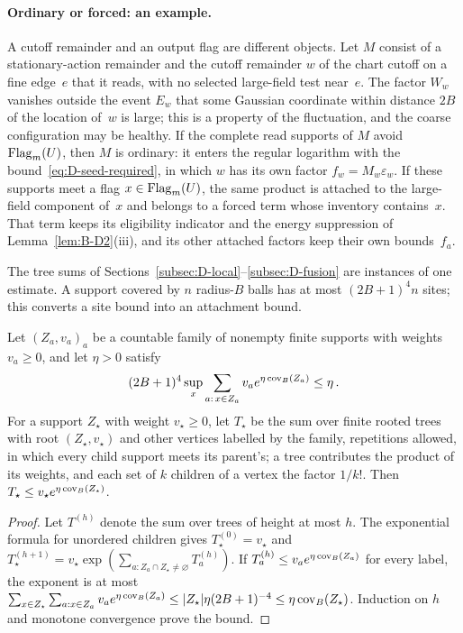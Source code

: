 \paragraph{Ordinary or forced: an example.} A cutoff remainder and an output flag are different objects. Let $M$ consist of a stationary-action remainder and the cutoff remainder $w$ of the chart cutoff on a fine edge~$e$ that it reads, with no selected large-field test near~$e$. The factor $W_w$ vanishes outside the event $E_w$ that some Gaussian coordinate within distance $2B$ of the location of~$w$ is large; this is a property of the fluctuation, and the coarse configuration may be healthy. If the complete read supports of $M$ avoid $\operatorname{Flag}_m(U)$, then $M$ is ordinary: it enters the regular logarithm with the bound~\eqref{eq:D-seed-required}, in which $w$ has its own factor $f_w=M_w\varepsilon_w$. If these supports meet a flag $x\in\operatorname{Flag}_m(U)$, the same product is attached to the large-field component of~$x$ and belongs to a forced term whose inventory contains~$x$. That term keeps its eligibility indicator and the energy suppression of Lemma~\ref{lem:B-D2}(iii), and its other attached factors keep their own bounds~$f_a$.

The tree sums of Sections~\ref{subsec:D-local}--\ref{subsec:D-fusion} are instances of one estimate. A support covered by $n$ radius-$B$ balls has at most $(2B+1)^4n$ sites; this converts a site bound into an attachment bound.

\begin{lemma}\label{lem:D-rooted}
Let $(Z_a,v_a)_a$ be a countable family of nonempty finite supports with weights $v_a\ge0$, and let $\eta>0$ satisfy
\begin{equation*}
(2B+1)^4\sup_x\sum_{a:\,x\in Z_a}v_ae^{\eta\operatorname{cov}_B(Z_a)}\le\eta\,.
\end{equation*}
For a support $Z_\star$ with weight $v_\star\ge0$, let $T_\star$ be the sum over finite rooted trees with root $(Z_\star,v_\star)$ and other vertices labelled by the family, repetitions allowed, in which every child support meets its parent's; a tree contributes the product of its weights, and each set of $k$ children of a vertex the factor $1/k!$. Then $T_\star\le v_\star e^{\eta\operatorname{cov}_B(Z_\star)}$.
\end{lemma}

\begin{proof}
Let $T^{(h)}$ denote the sum over trees of height at most $h$. The exponential formula for unordered children gives $T_\star^{(0)}=v_\star$ and $T_\star^{(h+1)}=v_\star\exp(\sum_{a:Z_a\cap Z_\star\ne\varnothing}T_a^{(h)})$. If $T_a^{(h)}\le v_ae^{\eta\operatorname{cov}_B(Z_a)}$ for every label, the exponent is at most $\sum_{x\in Z_\star}\sum_{a:x\in Z_a}v_ae^{\eta\operatorname{cov}_B(Z_a)}\le|Z_\star|\eta(2B+1)^{-4}\le\eta\operatorname{cov}_B(Z_\star)$. Induction on $h$ and monotone convergence prove the bound.
\end{proof}


